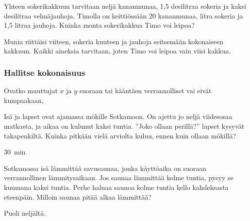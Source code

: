 \begin{tehtavasivu}
\begin{tehtava}
Yhteen sokerikakkuun tarvitaan neljä kananmunaa, 1,5 desilitraa sokeria ja kaksi desilitraa vehnäjauhoja. Timolla on keittiössään 20 kananmunaa, litra sokeria ja 1,5 litraa jauhoja. Kuinka monta sokerikakkua Timo voi leipoa?  
\begin{vastaus}
Munia riittäisi viiteen, sokeria kuuteen ja jauhoja seitsemään kokonaiseen kakkuun. Kaikki aineksia tarvitaan, joten Timo voi leipoa vain viisi kakkua.
\end{vastaus}
\end{tehtava}

\subsubsection*{Hallitse kokonaisuus}


\begin{tehtava}
Ovatko muuttujat $ x $ ja $ y $ suoraan tai kääntäen verrannolliset vai eivät kumpaakaan,
\begin{alakohdat}
\end{alakohdat}
\begin{vastaus}
\begin{alakohdat}
\end{alakohdat}
\end{vastaus}
\end{tehtava}

\begin{tehtava}
    Isä ja lapset ovat ajamassa mökille Sotkamoon. On ajettu jo neljä
    viidesosaa matkasta, ja aikaa on kulunut kaksi tuntia. ''Joko ollaan perillä?''
    lapset kysyvät takapenkiltä. Kuinka pitkään vielä arviolta kuluu, ennen
    kuin ollaan mökillä?
    
    \begin{vastaus}
        $30$~min
    \end{vastaus}
\end{tehtava}

\begin{tehtava}
Sotkamossa isä lämmittää savusaunaa, jonka käyttöaika on suoraan verrannollinen lämmitysaikaan. Jos saunaa lämmittää kolme tuntia, pysyy se kuumana kaksi tuntia. Perhe haluaa saunoa kolme tuntia kello kahdeksasta eteenpäin. Milloin saunaa pitää alkaa lämmittää?
\begin{vastaus}
Puoli neljältä.
\end{vastaus}
\end{tehtava}


\end{tehtavasivu}
